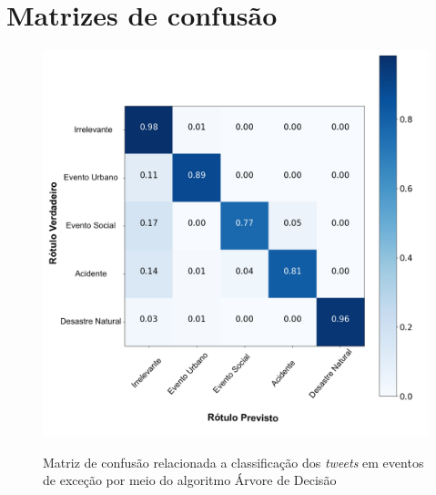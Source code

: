 \documentclass[
	12pt,				%
	oneside,			%
	a4paper,			%
	english,			%
	brazil				%
	]{abntex2ppgsi}
\begin{document}
{{{\begin{apendicesenv}
\begin{longtable}{c|c|p{7cm}}
\end{longtable}

\normalsize

\chapter{Matrizes de confusão}
\label{apendiceE}

\begin{figure}[!htb]
	\centering
 	  \caption{Matriz de confusão relacionada a classificação dos \textit{tweets} em eventos de exceção por meio do algoritmo Árvore de Decisão}
		\includegraphics[width=1\linewidth]{images/confusion_matrix_dt_pt.png}
	\label{fig:confusion_matrix_dt}
\end{figure}


\end{apendicesenv}}}}
\end{document}
